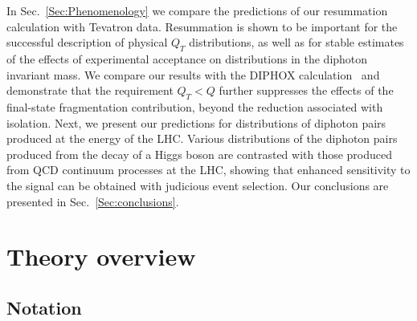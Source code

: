 \documentclass[12pt,english,aps,preprint,prd,letterpaper,fleqn,nofootinbib,showpacs,showkeys,tightenlines,floatfix]{revtex4}
\begin{document}
In Sec.~\ref{Sec:Phenomenology} we compare the predictions of our
resummation calculation with Tevatron data.  Resummation is shown to 
be important for the successful description of physical $Q_{T}$ 
distributions, as well as for stable estimates of the effects of experimental 
acceptance on distributions in the diphoton invariant mass.
We compare our results with the DIPHOX calculation~\cite{Binoth:1999qq}
and demonstrate that
the requirement $Q_{T}<Q$ further suppresses the effects of the final-state
fragmentation contribution, beyond the reduction associated with isolation.
Next, we present our
predictions for distributions of diphoton pairs produced at the energy
of the LHC. Various distributions of the diphoton pairs
produced from the decay of a Higgs boson are contrasted 
with those produced from QCD continuum 
processes at the LHC, showing that enhanced sensitivity
to the signal can be obtained with judicious event selection. Our
conclusions are presented in Sec.~\ref{Sec:conclusions}.


\section{Theory overview \label{Sec:Theory}}


\subsection{Notation \label{sub:Notations}}
\end{document}
